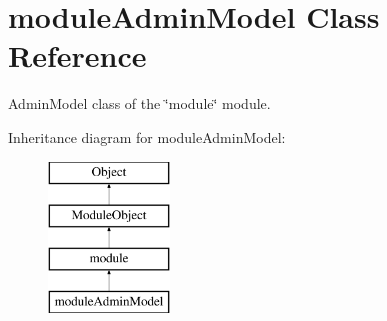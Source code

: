 \hypertarget{classmoduleAdminModel}{}\section{module\+Admin\+Model Class Reference}
\label{classmoduleAdminModel}


Admin\+Model class of the \char`\"{}module\char`\"{} module.  


Inheritance diagram for module\+Admin\+Model\+:\begin{figure}[H]
\begin{center}
\leavevmode
\includegraphics[height=4.000000cm]{classmoduleAdminModel}
\end{center}
\end{figure}
